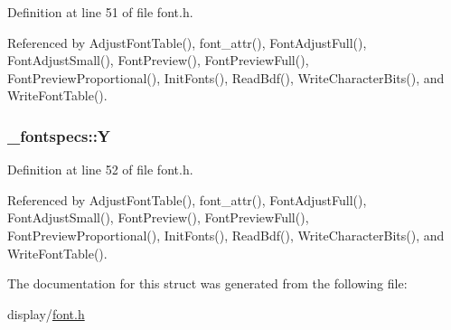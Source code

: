Definition at line 51 of file font.\-h.



Referenced by Adjust\-Font\-Table(), font\-\_\-attr(), Font\-Adjust\-Full(), Font\-Adjust\-Small(), Font\-Preview(), Font\-Preview\-Full(), Font\-Preview\-Proportional(), Init\-Fonts(), Read\-Bdf(), Write\-Character\-Bits(), and Write\-Font\-Table().

\hypertarget{struct__fontspecs_a9771541eab33755d22c804f3bedf8682}{
\subsubsection[{Y}]{ \-\_\-fontspecs\-::\-Y}}\label{struct__fontspecs_a9771541eab33755d22c804f3bedf8682}


Definition at line 52 of file font.\-h.



Referenced by Adjust\-Font\-Table(), font\-\_\-attr(), Font\-Adjust\-Full(), Font\-Adjust\-Small(), Font\-Preview(), Font\-Preview\-Full(), Font\-Preview\-Proportional(), Init\-Fonts(), Read\-Bdf(), Write\-Character\-Bits(), and Write\-Font\-Table().



The documentation for this struct was generated from the following file\-:\begin{DoxyCompactItemize}
\item 
display/\hyperlink{display_2font_8h}{font.\-h}\end{DoxyCompactItemize}
